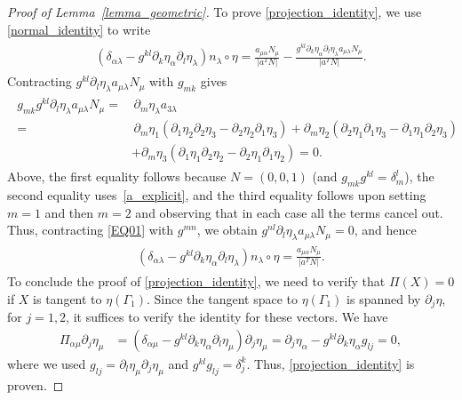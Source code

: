 \documentclass[10pt,reqno]{amsart}
\theoremstyle{plain}
\theoremstyle{definition}
\numberwithin{equation}{section}
\newcommand{\al}{\alpha}
\newcommand{\Ga}{\Gamma}
\newcommand{\de}{\delta}
\newcommand{\la}{\lambda}
\begin{document}
\begin{proof}[Proof of Lemma~\ref{lemma_geometric}]
To prove \eqref{projection_identity}, we use \eqref{normal_identity} 
to write
\begin{align}
\begin{split}
(\de_{\al\la} - g^{kl} \partial_k \eta_\al \partial_l \eta_\la)
n_\la \circ \eta 
= \frac{ a_{\mu \al} N_\mu }{ |a^T N |} -
\frac{g^{kl} \partial_k \eta_\al \partial_l \eta_\la a_{\mu \la} N_\mu }{|a^T N|}.
\end{split}
\nonumber
\end{align}
Contracting $g^{kl} \partial_l \eta_\la a_{\mu \la} N_\mu$
with $g_{mk}$ gives
\begin{align}
\begin{split}
g_{mk} g^{kl}\partial_l \eta_\la a_{\mu \la} N_\mu  
= &\, \partial_m \eta_\la a_{3 \la}
\\
 = & \,
\partial_m \eta_1
(\partial_1 \eta_2 \partial_2 \eta_3 - \partial_2 \eta_2 \partial_1 \eta_3)
+ 
\partial_m \eta_2
(\partial_2 \eta_1 \partial_1 \eta_3 - \partial_1 \eta_1 \partial_2 \eta_3)
\\
&
+
\partial_m \eta_3
(\partial_1 \eta_1 \partial_2 \eta_2 - \partial_2 \eta_1 \partial_1 \eta_2)
=0.
\end{split}
   \label{EQ01}
\end{align}
Above, the first equality follows because $N = (0,0,1)$ (and $g_{mk} g^{kl} = \de_m^l$),
the second equality uses~\eqref{a_explicit}, and the third equality follows upon setting
$m=1$ and then $m=2$ and observing that in each case all the terms cancel out.
Thus, contracting \eqref{EQ01} with $g^{m n}$, we obtain
$
g^{nl}\partial_l \eta_\la a_{\mu \la} N_\mu  =  0
$,
and hence
\begin{align}
\begin{split}
(\de_{\al\la} - g^{kl} \partial_k \eta_\al \partial_l \eta_\la)
n_\la \circ \eta 
= \frac{ a_{\mu \al} N_\mu }{ |a^T N |}.
\end{split}
\nonumber
\end{align}
To conclude the proof of \eqref{projection_identity}, we need to verify that $\Pi(X) = 0$
if $X$ is tangent to $\eta(\Ga_1)$. Since the tangent space to  $\eta(\Ga_1)$ is spanned
by $\partial_j \eta$, for $j=1,2$, it suffices to verify the identity
for these vectors. We have
\begin{align}
\Pi_{\al \mu} \partial_j \eta_\mu & = (\delta_{\al\mu} - g^{kl}\partial_k \eta_\al \partial_l \eta_\mu)
\partial_j \eta_\mu 
\nonumber
=
\partial_j \eta_\al - 
g^{kl}\partial_k \eta_\al g_{lj} 
 = 0,
\end{align}
where we used  $g_{lj} = \partial_l \eta_\mu \partial_j \eta_\mu$ and 
$g^{kl} g_{lj} = \delta^k_j$.
Thus, \eqref{projection_identity} is proven.


\end{proof}
\end{document}
